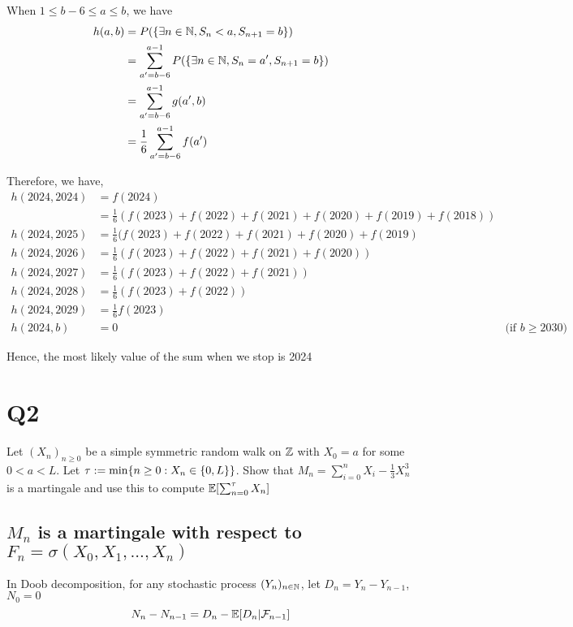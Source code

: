 \documentclass{article}
\begin{document}
When $1 \leq b-6 \leq a \leq b$, we have
\begin{align*}
    h(a, b)
    &= P(\{\exists n \in \mathbb{N}, S_n < a, S_{n+1} = b\}) \\
    &= \sum_{a'=b-6}^{a-1} P(\{\exists n \in \mathbb{N}, S_n = a', S_{n+1} = b\}) \\
    &= \sum_{a'=b-6}^{a-1} g(a', b) \\
    &= \frac{1}{6} \sum_{a'=b-6}^{a-1} f(a') \\
\end{align*}

Therefore, we have,
\begin{align*}
    h(2024, 2024) &= f(2024) \\
                &= \frac{1}{6} (f(2023) + f(2022) + f(2021) + f(2020) + f(2019) + f(2018)) \\
    h(2024, 2025) &= \frac{1}{6} (f(2023) + f(2022) + f(2021) + f(2020) + f(2019) \\
    h(2024, 2026) &= \frac{1}{6} (f(2023) + f(2022) + f(2021) + f(2020)) \\
    h(2024, 2027) &= \frac{1}{6} (f(2023) + f(2022) + f(2021)) \\
    h(2024, 2028) &= \frac{1}{6} (f(2023) + f(2022)) \\
    h(2024, 2029) &= \frac{1}{6} f(2023) \\
    h(2024, b) &= 0 &\text{(if $b \geq 2030$)}
\end{align*}

Hence, the most likely value of the sum when we stop is 2024

\section{Q2}

Let $(X_n)_{n \geq 0}$ be a simple symmetric random walk on $\mathbb{Z}$ with $X_0 = a$ for some $0 < a < L$. Let $\tau := \min\{n \geq 0: X_n \in \{0, L\}\}$. Show that $M_n = \sum_{i=0}^n X_i - \frac{1}{3} X_n^3$ is a martingale and use this to compute $\Exp\bracket*{\sum_{n=0}^\tau X_n}$

\subsection{$M_n$ is a martingale with respect to $F_n = \sigma(X_0, X_1, ..., X_n)$}

In Doob decomposition, for any stochastic process $(Y_n)_{n \in \mathbb{N}}$, let $D_n = Y_n - Y_{n-1}$, $N_0 = 0$
$$
    N_n - N_{n-1} = D_n - \mathbb{E}[D_n | \mathcal{F}_{n-1}]
$$
\end{document}
